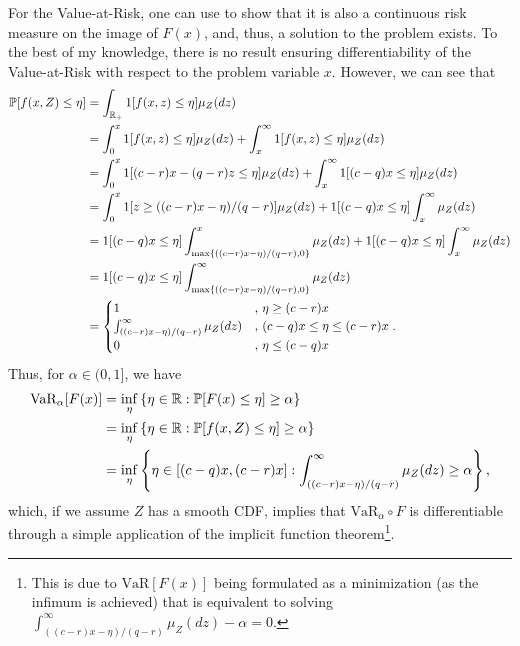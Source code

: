 \documentclass[12pt]{article}
\begin{document}
For the Value-at-Risk, one can use \citet[Theorem~2]{ivanovBilevelStochasticLinear2014} to show that it is also a continuous risk measure on the image of $F(x)$, and, thus, a solution to the problem exists.
To the best of my knowledge, there is no result ensuring differentiability of the Value-at-Risk with respect to the problem variable $x$.
However, we can see that
\begin{align*}
    \mathbb{P}[ f(x,Z) \le \eta] &= \int_{\mathbb{R}_{+}} 1[f(x,z) \le \eta] \mu_Z(dz) \\
    &= \int_{0}^{x} 1[f(x,z) \le \eta] \mu_Z(dz) + \int_{x}^{\infty} 1[f(x,z) \le \eta] \mu_Z(dz) \\
    &= \int_{0}^{x} 1[(c-r)x - (q-r)z \le \eta] \mu_Z(dz) + \int_{x}^{\infty} 1[(c-q)x \le \eta] \mu_Z(dz) \\
    &= \int_{0}^{x} 1[z \ge ((c-r)x - \eta) / (q-r)] \mu_Z(dz) + 1[(c-q)x \le \eta] \int_{x}^{\infty} \mu_Z(dz) \\
    &= 1[(c-q)x \le \eta] \int_{\max\{((c-r)x - \eta) / (q-r),0\}}^{x} \mu_Z(dz) + 1[(c-q)x \le \eta] \int_{x}^{\infty} \mu_Z(dz) \\
    &= 1[(c-q)x \le \eta] \int_{\max\{((c-r)x - \eta) / (q-r),0\}}^{\infty} \mu_Z(dz) \\
    &= \begin{cases}
	1 &,\, \eta \ge (c-r)x  \\
	\int_{((c-r)x - \eta) / (q-r)}^{\infty} \mu_Z(dz)  &,\, (c-q)x \le \eta \le  (c-r)x \\
	0  &,\, \eta \le (c-q)x
    \end{cases}
.\end{align*}
Thus, for $\alpha \in (0,1]$, we have 
\begin{align*}
    \text{VaR}_{\alpha}[F(x)] &= \inf_{\eta}\left\{ \eta \in \mathbb{R} : \mathbb{P}[ F(x) \le \eta] \ge \alpha  \right\} \\
    &= \inf_{\eta}\left\{ \eta \in \mathbb{R} : \mathbb{P}[ f(x,Z) \le \eta] \ge \alpha  \right\} \\
    &= \inf_{\eta}\left\{ \eta \in [(c-q)x,(c-r)x] : \int_{((c-r)x - \eta) / (q-r)}^{\infty} \mu_Z(dz) \ge \alpha   \right\}
,\end{align*} 
which, if we assume $Z$ has a smooth CDF, implies that $\text{VaR}_\alpha \circ F$ is differentiable through a simple application of the implicit function theorem\footnote{This is due to $\text{VaR}[F(x)]$ being formulated as a minimization (as the infimum is achieved) that is equivalent to solving $\int_{((c-r)x - \eta) / (q-r)}^{\infty} \mu_Z(dz) - \alpha = 0$.}.
\end{document}
